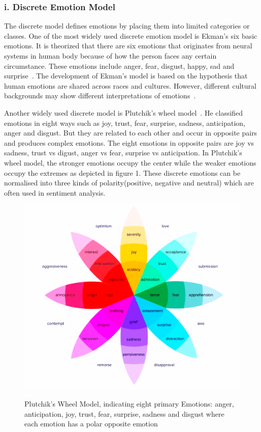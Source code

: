 \documentclass[runningheads]{llncs}
\begin{document}
\subsubsection{i. Discrete Emotion Model}

The discrete model defines emotions by placing them into limited categories or classes. One of the most widely used discrete emotion model is Ekman's six basic emotions. It is theorized that there are six emotions that originates from neural systems in human body because of how the person faces any certain circumstance. These emotions include anger, fear, disgust, happy, sad and surprise~\cite{ref11}. The development of Ekman's model is based on the hypothesis that human emotions are shared across races and cultures. However, different cultural backgrounds may show different interpretations of emotions~\cite{ref12}.

Another widely used discrete model is Plutchik's wheel model~\cite{ref10}. He classified emotions in eight ways such as joy, trust, fear, surprise, sadness, anticipation, anger and disgust. But they are related to each other and occur in opposite pairs and produces complex emotions. The eight emotions in opposite pairs are joy vs sadness, trust vs digust, anger vs fear, surprise vs anticipation. In Plutchik's wheel model, the stronger emotions occupy the center while the weaker emotions occupy the extremes as depicted in figure 1. These discrete emotions can be normalised into three kinds of polarity(positive, negative and neutral) which are often used in sentiment analysis.
\begin{figure}[ht!]
\centering
\includegraphics[scale=0.6]{plutchik}\label{Plutchik}
\caption{Plutchik's Wheel Model, indicating eight primary Emotions: anger, anticipation, joy, trust, fear, surprise, sadness and disgust where each emotion has a polar opposite emotion}
\end{figure} 
\end{document}
